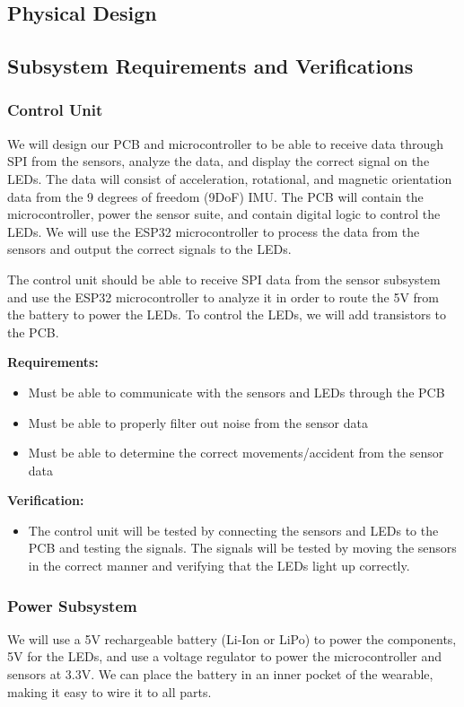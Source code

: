 \documentclass[12pt]{article}
\begin{document}
\subsection{Physical Design}
\subsection{Subsystem Requirements and Verifications}
    \subsubsection{Control Unit} 
    We will design our PCB and microcontroller to be able to 
    receive data through SPI from the sensors, analyze the data, 
    and display the correct signal on the LEDs. The data will 
    consist of acceleration, rotational, and magnetic orientation
    data from the 9 degrees of freedom (9DoF) IMU. The PCB will 
    contain the microcontroller, power the sensor suite, and 
    contain digital logic to control the LEDs. We will use the 
    ESP32 microcontroller \cite{EspressifESP32} to process the data from the sensors 
    and output the correct signals to the LEDs. 

    The control unit should be able to receive SPI data from the 
    sensor subsystem and use the ESP32 microcontroller to analyze 
    it in order to route the 5V from the battery to power the LEDs. 
    To control the LEDs, we will add transistors \cite{MicrochipVN10K} to the PCB. 

    \textbf{Requirements:} 
    \begin{itemize}
        \item Must be able to communicate with the sensors and LEDs through the PCB
        \item Must be able to properly filter out noise from the sensor data
        \item Must be able to determine the correct movements/accident from the sensor data
    \end{itemize}

    \textbf{Verification:}
    \begin{itemize}
        \item The control unit will be tested by connecting the sensors and 
        LEDs to the PCB and testing the signals. The signals will be 
        tested by moving the sensors in the correct manner and 
        verifying that the LEDs light up correctly.
    \end{itemize}
    \subsubsection{Power Subsystem} 
	We will use a 5V rechargeable battery (Li-Ion or LiPo) to 
    power the components, 5V for the LEDs, and use a voltage 
    regulator \cite{DiodesIncorporatedAP2112} to power the microcontroller and sensors at 3.3V. 
    We can place the battery in an inner pocket of the wearable,
    making it easy to wire it to all parts. 
\end{document}
